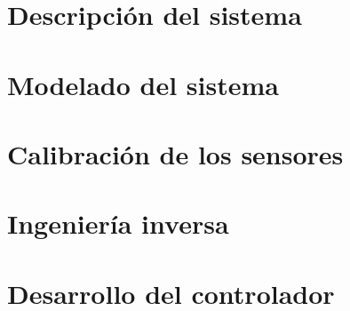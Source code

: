 \documentclass[spanish,12pt,a4paper,titlepage]{report}
\begin{document}

\part{Descripción del sistema}


\part{Modelado del sistema}


\part{Calibración de los sensores}





\part{Ingeniería inversa}


\part{Desarrollo del controlador}




\cleardoublepage
\addappheadtotoc
\appendixpage
\renewcommand{\appendixname}{Anexo}
\renewcommand{\appendixtocname}{Anexo}
\renewcommand{\appendixpagename}{Anexos}

\appendix %

 

 

\end{document}
